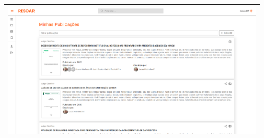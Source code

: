 \begin{table}[H]
\begin{tabular}{|p{1cm}|p{14cm}|}
        \multicolumn{2}{|c|}{\includegraphics[scale=0.294]{img/resoar-my-research.png}}                                                                                                                                                                                                                                                                                                         \\ \hline
    \end{tabular}
\end{table}

